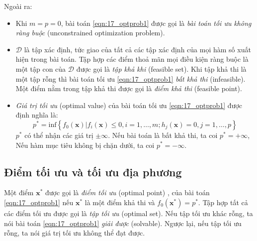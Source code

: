 Ngoài ra:
\begin{itemize}
\item Khi $m = p = 0$, bài toán \eqref{eqn:17_optprob1} được gọi là
\textit{bài toán tối ưu không ràng buộc} ({unconstrained optimization
problem}).

\item $\mathcal{D}$ là tập xác định, tức giao của tất cả các tập xác định
của mọi hàm số xuất hiện trong bài toán. Tập hợp các điểm thoả mãn mọi điều
kiện ràng buộc là một tập con của $\mathcal{D}$ được gọi là \textit{tập khả khi} (feasible set). Khi tập khả thi là một tập rỗng thì bài toán tối ưu \eqref{eqn:17_optprob1} \textit{bất khả thi} ({infeasible}). Một điểm nằm trong tập khả thi được gọi là \textit{điểm khả thi} (feasible point).

\item  \textit{Giá trị tối ưu} (optimal value) của bài toán tối ưu \eqref{eqn:17_optprob1} được định nghĩa là:
\begin{equation*}
p^* = \text{inf}\left\{f_0(\mathbf{x}) | f_i(\mathbf{x}) \leq 0, i = 1, \dots, m; h_j(\mathbf{x}) = 0, j = 1, \dots, p\right\}
\end{equation*}
$p^*$ có thể nhận các giá
trị $\pm \infty$. Nếu bài toán là bất khả thi, ta coi $p^* = + \infty$, Nếu hàm mục tiêu
không bị chặn dưới, ta coi
$p^* = - \infty$.

\end{itemize}


\subsection{Điểm tối ưu và tối ưu địa phương}

Một điểm $\mathbf{x}^*$ được gọi là \textit{điểm tối ưu} ({optimal point})
, của bài toán
\eqref{eqn:17_optprob1} nếu $\mathbf{x}^*$ là một điểm khả thi và
$f_0(\mathbf{x}^*) = p^*$. Tập hợp tất cả các điểm tối ưu được gọi là
\textit{tập tối ưu} ({optimal set}). Nếu tập tối ưu khác rỗng,
ta nói bài toán \eqref{eqn:17_optprob1} \textit{giải được}
({solvable}). Ngược lại, nếu tập tối ưu rỗng, ta nói giá trị tối ưu không thể đạt được.

